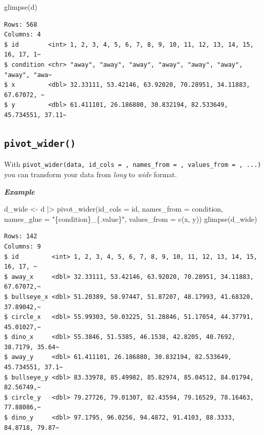 \documentclass[
  letterpaper,
  DIV=11,
  numbers=noendperiod,
  oneside]{scrreprt}
\newenvironment{Shaded}{\begin{snugshade}}{\end{snugshade}}
\newcommand{\AttributeTok}[1]{\textcolor[rgb]{0.40,0.45,0.13}{#1}}
\newcommand{\FunctionTok}[1]{\textcolor[rgb]{0.28,0.35,0.67}{#1}}
\newcommand{\NormalTok}[1]{\textcolor[rgb]{0.00,0.23,0.31}{#1}}
\newcommand{\OtherTok}[1]{\textcolor[rgb]{0.00,0.23,0.31}{#1}}
\newcommand{\SpecialCharTok}[1]{\textcolor[rgb]{0.37,0.37,0.37}{#1}}
\newcommand{\StringTok}[1]{\textcolor[rgb]{0.13,0.47,0.30}{#1}}
\begin{document}
\begin{Shaded}
\begin{Highlighting}[]
\FunctionTok{glimpse}\NormalTok{(d)}
\end{Highlighting}
\end{Shaded}

\begin{verbatim}
Rows: 568
Columns: 4
$ id        <int> 1, 2, 3, 4, 5, 6, 7, 8, 9, 10, 11, 12, 13, 14, 15, 16, 17, 1~
$ condition <chr> "away", "away", "away", "away", "away", "away", "away", "awa~
$ x         <dbl> 32.33111, 53.42146, 63.92020, 70.28951, 34.11883, 67.67072, ~
$ y         <dbl> 61.411101, 26.186880, 30.832194, 82.533649, 45.734551, 37.11~
\end{verbatim}

\hypertarget{pivot_wider}{%
\subsection{\texorpdfstring{\texttt{pivot\_wider()}}{pivot\_wider()}}\label{pivot_wider}}

With
\texttt{pivot\_wider(data,\ id\_cols\ =\ ,\ names\_from\ =\ ,\ values\_from\ =\ ,\ ...)}
you can transform your data from \emph{long} to \emph{wide} format.

\textbf{\emph{Example}}

\begin{Shaded}
\begin{Highlighting}[]
\NormalTok{d\_wide }\OtherTok{\textless{}{-}}\NormalTok{ d }\SpecialCharTok{|\textgreater{}} \FunctionTok{pivot\_wider}\NormalTok{(}\AttributeTok{id\_cols =}\NormalTok{ id, }\AttributeTok{names\_from =}\NormalTok{ condition, }\AttributeTok{names\_glue =} \StringTok{"\{condition\}\_\{.value\}"}\NormalTok{, }\AttributeTok{values\_from =} \FunctionTok{c}\NormalTok{(x, y))}
\FunctionTok{glimpse}\NormalTok{(d\_wide)}
\end{Highlighting}
\end{Shaded}

\begin{verbatim}
Rows: 142
Columns: 9
$ id         <int> 1, 2, 3, 4, 5, 6, 7, 8, 9, 10, 11, 12, 13, 14, 15, 16, 17, ~
$ away_x     <dbl> 32.33111, 53.42146, 63.92020, 70.28951, 34.11883, 67.67072,~
$ bullseye_x <dbl> 51.20389, 58.97447, 51.87207, 48.17993, 41.68320, 37.89042,~
$ circle_x   <dbl> 55.99303, 50.03225, 51.28846, 51.17054, 44.37791, 45.01027,~
$ dino_x     <dbl> 55.3846, 51.5385, 46.1538, 42.8205, 40.7692, 38.7179, 35.64~
$ away_y     <dbl> 61.411101, 26.186880, 30.832194, 82.533649, 45.734551, 37.1~
$ bullseye_y <dbl> 83.33978, 85.49982, 85.82974, 85.04512, 84.01794, 82.56749,~
$ circle_y   <dbl> 79.27726, 79.01307, 82.43594, 79.16529, 78.16463, 77.88086,~
$ dino_y     <dbl> 97.1795, 96.0256, 94.4872, 91.4103, 88.3333, 84.8718, 79.87~
\end{verbatim}
\end{document}
